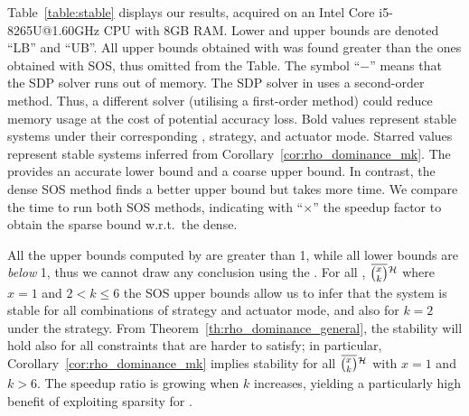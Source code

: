 Table~\ref{table:stable} displays our results, acquired on an Intel Core i5-8265U@1.60GHz CPU with 8GB RAM.
Lower and upper bounds are denoted ``LB'' and ``UB''. 
All upper bounds obtained with  was found greater than the ones obtained with SOS, thus omitted from the Table.
The symbol ``$-$'' means that the SDP solver runs out of memory.
%
The SDP solver in  uses a second-order method.
Thus, a different solver (utilising a first-order method) could reduce memory usage at the cost of potential accuracy loss.
Bold values represent stable systems under their corresponding \ewhc{}, strategy, and actuator mode.
Starred values represent stable systems inferred from Corollary~\ref{cor:rho_dominance_mk}.
%
The  provides an accurate lower bound and a coarse upper bound.
In contrast, the dense SOS method finds a better upper bound but takes more time.
We compare the time to run both SOS methods, indicating with ``$\times$'' the speedup factor to obtain the sparse bound w.r.t.~the dense.

% 

All the upper bounds computed by  are greater than 1, while all lower bounds are \emph{below} 1, thus we cannot draw any conclusion using the .
For all \ewhc{}, $\eanymiss{}{\strat}$ where $x=1$ and $2 < k \leq 6$ the SOS upper bounds allow us to infer that the system is stable for all combinations of strategy and actuator mode, and also for $k=2$ under the \tS{} strategy.
From Theorem~\ref{th:rho_dominance_general}, the stability will hold also for all constraints that are harder to satisfy; in particular, Corollary~\ref{cor:rho_dominance_mk} implies stability for all $\eanymiss{}{\strat}$ with $x=1$ and $k>6$.
The speedup ratio is growing when $k$ increases, yielding a particularly high benefit of exploiting sparsity for \tSZ{}.
